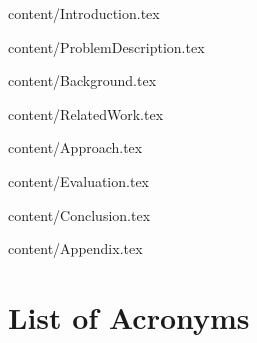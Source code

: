 \documentclass[footsepline,footinclude=false,oneside,fontsize=11pt,paper=a4,listof=totoc,bibliography=totoc]{scrbook} %
\begin{document}
\newpage
\setcounter{page}{1}
\begin{spacing}{1.2}
\hoffset=0mm



\end{spacing}


\tableofcontents

\newpage
\setlength{\baselineskip}{3ex}
\setcounter{page}{1}

\begin{spacing}{1.15}

 {content/Introduction.tex}

 {content/ProblemDescription.tex}

 {content/Background.tex}

 {content/RelatedWork.tex}

 {content/Approach.tex}

 {content/Evaluation.tex}

 {content/Conclusion.tex}

\appendix %

 {content/Appendix.tex}

\end{spacing}



\setcounter{tocdepth}{1}
\listoffigures{}
\setcounter{tocdepth}{1}
\listoftables{}

\renewcommand{\lstlistlistingname}{List of Listings}
\setcounter{tocdepth}{2}
\lstlistoflistings
\newpage
\setcounter{tocdepth}{2}
\chapter*{List of Acronyms}
	
\printbibliography{}
\end{document}
